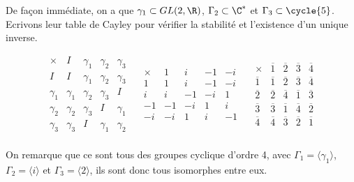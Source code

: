 De façon immédiate, on a que $\gamma_1 \subset GL(2, \R )$, $\Gamma_2 \subset \C^*$ et $\Gamma_3 \subset \cycle{5}$. Ecrivons leur table de Cayley pour vérifier la stabilité et l'existence d'un unique inverse.


\[
\begin{array}{c|cccc}
   \times   & I        & \gamma_1 & \gamma_2 & \gamma_3 \\ \hline
   I        & I        & \gamma_1 & \gamma_2 & \gamma_3 \\    
   \gamma_1 & \gamma_1 & \gamma_2 & \gamma_3 & I \\
   \gamma_2 & \gamma_2 & \gamma_3 & I        & \gamma_1 \\
   \gamma_3 & \gamma_3 & I        & \gamma_1 & \gamma_2 \\ 
\end{array}
\quad
\begin{array}{c|cccc}
   \times & 1 & i & -1 & -i \\ \hline
    1     & 1 & i & -1 & -i \\
    i     & i & -1 & -i & 1 \\
    -1    & -1& -i & 1 & i \\
    -i    & -i & 1 & i & -1 \\ 
\end{array}
\quad
\begin{array}{c|cccc}
   \times & \overline{1} & \overline{2} & \overline{3} & \overline{4} \\ \hline
   \overline{1} & \overline{1} & \overline{2} & \overline{3} & \overline{4} \\
   \overline{2} & \overline{2} & \overline{4} & \overline{1} & \overline{3}  \\
   \overline{3} & \overline{3} & \overline{1} & \overline{4} & \overline{2} \\
    \overline{4} & \overline{4} & \overline 3 & \overline 2 & \overline 1 \\ 
\end{array}
\]

On remarque que ce sont tous des groupes cyclique d'ordre 4, avec $\Gamma_1 = \langle \gamma_1 \rangle$,
$\Gamma_2 = \langle i \rangle$ et $\Gamma_3 = \langle 2 \rangle$, ils sont donc tous isomorphes entre eux.